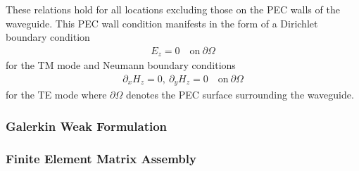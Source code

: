 These relations hold for all locations excluding those on the PEC walls of the waveguide. This PEC wall condition manifests in the form of a Dirichlet boundary condition
\begin{align}
	E_z=0 \quad \mathrm{on} \ \partial\Omega
	\label{eq:diriclet_tm}
\end{align}
for the TM mode and Neumann boundary conditions
\begin{align}
	\partial_x H_z = 0,\ \partial_y H_z = 0 \quad \mathrm{on} \ \partial\Omega
\end{align}
for the TE mode where $\partial\Omega$ denotes the PEC surface surrounding the waveguide.

\subsubsection{Galerkin Weak Formulation}
\label{subsub:galerkin_weak}


\subsubsection{Finite Element Matrix Assembly}
\label{subsub:mat_assembly}